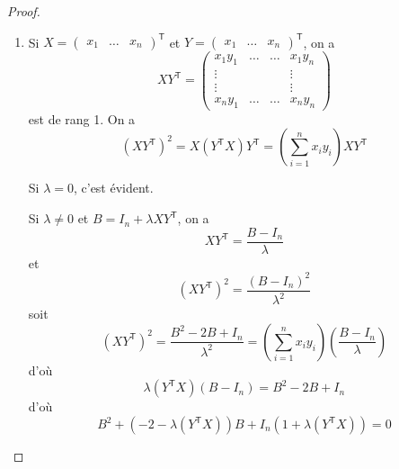 \begin{proof}
    \phantom{}
    \begin{enumerate}
        \item Si
        $X=\begin{pmatrix}
            x_{1} & \dots &x_{n}
        \end{pmatrix}^{\mathsf{T}}$ et $Y=\begin{pmatrix}
            x_{1} & \dots &x_{n}
        \end{pmatrix}^{\mathsf{T}}$, on a 
        \begin{equation}
            XY^{\mathsf{T}}=
            \begin{pmatrix}
                x_{1}y_{1}&\dots&\dots&x_{1}y_{n}\\
                \vdots & & & \vdots\\
                \vdots & & & \vdots\\
                x_{n}y_{1} & \dots & \dots & x_{n}y_{n}
            \end{pmatrix}
        \end{equation}
        est de rang 1. On a 
        \begin{equation}
            (XY^{\mathsf{T}})^{2}=X(Y^{\mathsf{T}}X)Y^{\mathsf{T}}=\left(\sum_{i=1}^{n}x_{i}y_{i}\right)XY^{\mathsf{T}}
        \end{equation}

        Si $\lambda=0$, c'est évident.

        Si $\lambda\neq0$ et $B=I_{n}+\lambda XY^{\mathsf{T}}$, on a
        \begin{equation}
            XY^{\mathsf{T}}=\frac{B-I_{n}}{\lambda}
        \end{equation}
        et 
        \begin{equation}
            (XY^{\mathsf{T}})^{2}=\frac{\left(B-I_{n}\right)^{2}}{\lambda^{2}}
        \end{equation}
        soit 
        \begin{equation}
            (XY^{\mathsf{T}})^{2}=\frac{B^{2}-2B+I_{n}}{\lambda^{2}}=\left(\sum_{i=1}^{n}x_{i}y_{i}\right)\left(\frac{B-I_{n}}{\lambda}\right)
        \end{equation}
        d'où 
        \begin{equation}
            \lambda\left(Y^{\mathsf{T}}X\right)\left(B-I_{n}\right)=B^{2}-2B+I_{n}
        \end{equation}
        d'où
        \begin{equation}
            B^{2}+\left(-2-\lambda\left(Y^{\mathsf{T}}X\right)\right)B+I_{n}\left(1+\lambda\left(Y^{\mathsf{T}}X\right)\right)=0
        \end{equation}


\end{enumerate}
\end{proof}
